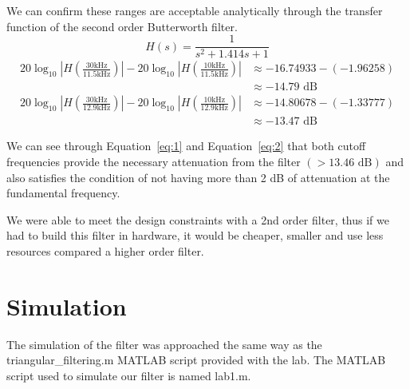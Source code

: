 \documentclass[12pt]{article}
\begin{document}
We can confirm these ranges are acceptable analytically through the transfer function of the second order Butterworth filter.
\begin{equation*}
    H(s) = \frac{1}{s^2 + 1.414s + 1}
\end{equation*}
\begin{equation} \label{eq:1}
\begin{aligned}
    20\log_{10}{\left|H\left(\frac{30 \text{kHz}}{11.5 \text{kHz}}\right)\right|} - 20\log_{10}{\left|H\left(\frac{10 \text{kHz}}{11.5 \text{kHz}}\right)\right|} &\approx -16.74933 - (-1.96258) \\
    &\approx -14.79 \text{ dB}
\end{aligned}
\end{equation}
\begin{equation} \label{eq:2}
\begin{aligned}
    20\log_{10}{\left|H\left(\frac{30 \text{kHz}}{12.9 \text{kHz}}\right)\right|} - 20\log_{10}{\left|H\left(\frac{10 \text{kHz}}{12.9 \text{kHz}}\right)\right|} &\approx -14.80678 - (-1.33777) \\
    &\approx -13.47 \text{ dB}
\end{aligned}
\end{equation}

We can see through Equation~\ref{eq:1} and Equation~\ref{eq:2} that both cutoff frequencies provide the necessary attenuation from the filter $(> 13.46 \text{ dB})$ and also satisfies the condition of not having more than 2 dB of attenuation at the fundamental frequency.

We were able to meet the design constraints with a 2nd order filter, thus if we had to build this filter in hardware, it would be cheaper, smaller and use less resources compared a higher order filter.

\clearpage
\section*{Simulation}
The simulation of the filter was approached the same way as the triangular\_filtering.m MATLAB script provided with the lab. The MATLAB script used to simulate our filter is named lab1.m.
\end{document}
